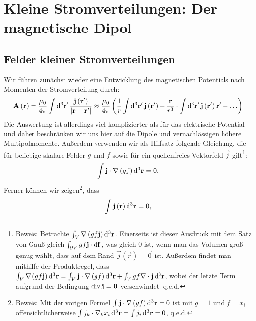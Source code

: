 \section{Kleine Stromverteilungen: Der magnetische Dipol}

\subsection{Felder kleiner Stromverteilungen}

Wir führen zunächst wieder eine Entwicklung des magnetischen Potentials nach Momenten der Stromverteilung durch:
\begin{equation}
	\label{eq:entwicklung_magn_potential}
	\vec {A}\left(\vec {r}\right)=\frac{\mu _{0}}{4\pi }\int \diffa[3]{\vec{r}'}\frac{\vec {j}\left(\vec {r}'\right)}{\left| \vec {r}-\vec {r}'\right| }\approx \frac{\mu _{0}}{4\pi }\left(\frac{1}{r}\int \diffa[3]{\vec{r}'}\vec {j}\left(\vec {r}'\right)+\frac{\vec {r}}{r^{3}}\cdot \int \diffa[3]{\vec{r}'}\vec {j}\left(\vec {r}'\right)\vec {r}'+\ldots \right)
\end{equation}
Die Auswertung ist allerdings viel komplizierter als für das elektrische Potential und daher beschränken wir uns hier auf die Dipole und vernachlässigen höhere Multipolmomente. Außerdem verwenden wir als Hilfsatz folgende Gleichung, die für beliebige skalare Felder $g$ und $f$ sowie für ein quellenfreies Vektorfeld $\vec {j}$ gilt\footnote{Beweis: Betrachte $\int _{V}\nabla \left(gf\vec {j}\right)\diffa[3]{\vec{r}}$. Einerseits ist dieser Ausdruck mit dem Satz von Gauß gleich $\int _{\partial V}gf\vec {j}\cdot \diff \vec {f}$, was gleich $0$ ist, wenn man das Volumen groß genug wählt, dass auf dem Rand $\vec {j}\left(\vec {r}\right)=\vec {0}$ ist. Außerdem findet man mithilfe der Produktregel, dass $\int _{V}\nabla \left(gf\vec {j}\right)\diffa[3]{\vec{r}}=\int _{V}\vec {j}\cdot \nabla \left(gf\right)\diffa[3]{\vec{r}}+\int _{V}gf\nabla \cdot \vec {j}\diffa[3]{\vec{r}}$, wobei der letzte Term aufgrund der Bedingung $\divg \vec {j}=\vec {0}$ verschwindet, q.e.d.}:
\begin{equation}
	\label{eq:hilfssatz}
	\int \vec {j}\cdot \nabla \left(gf\right)\diffa[3]{\vec{r}}=0.
\end{equation}
Ferner können wir zeigen\footnote{Beweis: Mit der vorigen Formel $\int \vec {j}\cdot \nabla \left(gf\right)\diffa[3]{\vec{r}}=0$ ist mit $g=1$ und $f=x_{i}$ offensichtlicherweise $\int j_{k}\cdot \nabla _{k}x_{i}\diffa[3]{\vec{r}}=\int j_{i}\diffa[3]{\vec{r}}=0$, q.e.d. }, dass
\begin{equation*}
	\int \vec {j}\left(\vec {r}\right)\diffa[3]{\vec{r}}=0,
\end{equation*}
